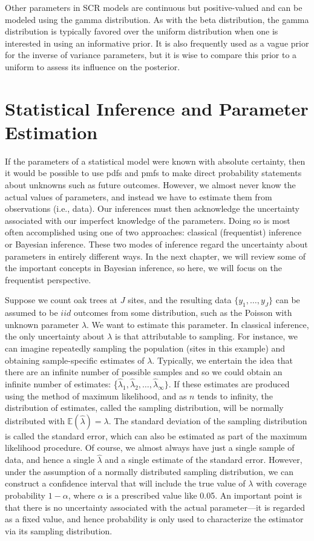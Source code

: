 Other parameters in SCR models are continuous but
positive-valued and can be modeled using the gamma distribution. As
with the beta distribution, the gamma distribution is typically
favored over the uniform distribution when one is interested in using
an informative prior. It is also frequently used as a vague prior for
the inverse of variance parameters, but it is wise to compare this
prior to a uniform to assess its influence on the posterior.

\section{Statistical Inference and Parameter Estimation}

If the parameters of a statistical model were known with absolute
certainty, then it would be possible to
use pdfs and pmfs to make direct
probability statements about unknowns such as future outcomes. However, we
almost never know the actual values of parameters, and instead we have
to estimate them from observations (i.e., data). Our inferences must then acknowledge the uncertainty
associated with our imperfect knowledge of the parameters. Doing so is
most often accomplished using one of two approaches:
classical (frequentist) inference or Bayesian
inference. These two modes of inference
regard the uncertainty about parameters in
entirely different ways. In the next chapter, we will review some of
the important concepts in Bayesian inference, so here, we will
focus on the frequentist perspective.

Suppose  we count oak trees at
$J$ sites, and the resulting data $\{y_1, \ldots, y_J\}$ can be
assumed to be $iid$ outcomes from some
distribution, such as the Poisson with unknown parameter $\lambda$. We
want to estimate this parameter. In classical inference, the only
uncertainty about $\lambda$ is that attributable to
sampling. For instance, we can imagine repeatedly sampling the
population (sites in this example) and obtaining sample-specific estimates of
$\lambda$. Typically, we entertain the idea that there are an infinite
number of possible samples and so we could obtain an infinite
number of estimates: \{$\hat{\lambda}_1, \hat{\lambda}_2, \hdots,
\hat{\lambda}_\infty\}$. If
these estimates are produced using the method of maximum likelihood,
and as $n$ tends to infinity,
the distribution of estimates, called the sampling distribution, will
be normally distributed with $\mathbb{E}(\hat{\lambda})=\lambda$. The
standard deviation of the sampling distribution is called the standard
error, which can also be estimated as part of the maximum likelihood
procedure. Of course, we almost always have just a single sample of
data, and hence a single $\hat{\lambda}$ and a single estimate of the
standard error. However, under the assumption of a normally
distributed sampling distribution, we can construct a confidence interval
that will include the true value of $\lambda$ with %
coverage probability $1-\alpha$, where $\alpha$ is a prescribed value
like 0.05. An important point is that there is
no uncertainty associated with the actual parameter---it is regarded
as a fixed value, and hence probability is only used to characterize
the estimator via its sampling distribution.

